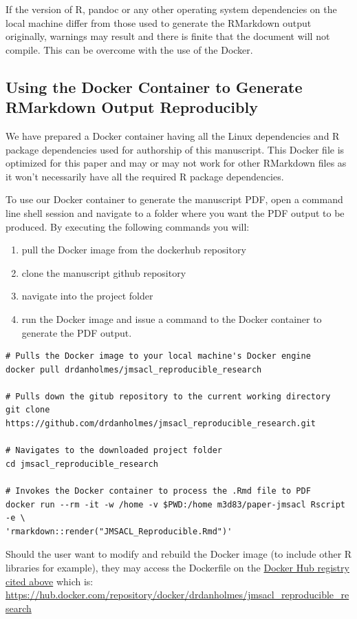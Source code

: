 \documentclass[]{elsarticle} %
\providecommand{\tightlist}{%
  \setlength{\itemsep}{0pt}\setlength{\parskip}{0pt}}
\begin{document}
If the version of R, pandoc or any other operating system dependencies
on the local machine differ from those used to generate the RMarkdown
output originally, warnings may result and there is finite that the
document will not compile. This can be overcome with the use of the
Docker.

\hypertarget{using-the-docker-container-to-generate-rmarkdown-output-reproducibly}{%
\subsection*{Using the Docker Container to Generate RMarkdown Output
Reproducibly}\label{using-the-docker-container-to-generate-rmarkdown-output-reproducibly}}

We have prepared a Docker container having all the Linux dependencies
and R package dependencies used for authorship of this manuscript. This
Docker file is optimized for this paper and may or may not work for
other RMarkdown files as it won't necessarily have all the required R
package dependencies.

To use our Docker container to generate the manuscript PDF, open a
command line shell session and navigate to a folder where you want the
PDF output to be produced. By executing the following commands you will:

\begin{enumerate}
\def\labelenumi{\arabic{enumi})}
\tightlist
\item
  pull the Docker image from the dockerhub repository
\item
  clone the manuscript github repository
\item
  navigate into the project folder
\item
  run the Docker image and issue a command to the Docker container to
  generate the PDF output.
\end{enumerate}

\begin{verbatim}
# Pulls the Docker image to your local machine's Docker engine
docker pull drdanholmes/jmsacl_reproducible_research

# Pulls down the gitub repository to the current working directory
git clone https://github.com/drdanholmes/jmsacl_reproducible_research.git

# Navigates to the downloaded project folder
cd jmsacl_reproducible_research

# Invokes the Docker container to process the .Rmd file to PDF
docker run --rm -it -w /home -v $PWD:/home m3d83/paper-jmsacl Rscript -e \
'rmarkdown::render("JMSACL_Reproducible.Rmd")'
\end{verbatim}

Should the user want to modify and rebuild the Docker image (to include
other R libraries for example), they may access the Dockerfile on the
\href{https://hub.docker.com/repository/docker/drdanholmes/jmsacl_reproducible_research}{Docker
Hub registry cited above} which is:
\url{https://hub.docker.com/repository/docker/drdanholmes/jmsacl_reproducible_research}
\end{document}

